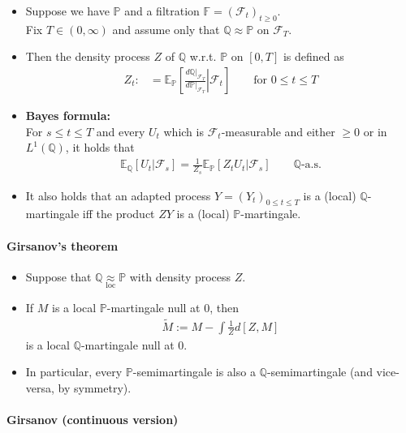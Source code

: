 \documentclass[a4paper,landscape,8pt,fleqn]{scrartcl}
\renewcommand{\emph}[1]{\textbf{#1}}
\begin{document}
\begin{multicols*}{3}
\begin{itemize}
\item Suppose we have $\mathbb{P}$ and a filtration $\mathbb{F} = (\mathcal{F}_t)_{t \geq 0}$. \\
Fix $T \in (0,\infty)$ and assume only that $\mathbb{Q} \approx \mathbb{P}$ on $\mathcal{F}_T$.
\item Then the density process $Z$ of $\mathbb{Q}$ w.r.t. $\mathbb{P}$ on $[0,T]$ is defined as
\begin{align*}
Z_t :&= \mathbb{E}_\mathbb{P} \left[ \left. \frac{d\mathbb{Q}|_{\mathcal{F}_T}}{d\mathbb{P}|_{\mathcal{F}_T}} \right\vert \mathcal{F}_t \right] \qquad \text{for } 0 \leq t \leq T
\end{align*}
\item \emph{Bayes formula:} \\
For $s \leq t \leq T$ and every $U_t$ which is $\mathcal{F}_t$-measurable and either $\geq 0$ or in $L^1(\mathbb{Q})$, it holds that
\begin{align*}
\mathbb{E}_\mathbb{Q} [U_t | \mathcal{F}_s] = \frac{1}{Z_s} \mathbb{E}_\mathbb{P}[Z_t U_t | \mathcal{F}_s] \qquad \mathbb{Q} \text{-a.s.}
\end{align*}
\item It also holds that an adapted process $Y = (Y_t)_{0 \leq t \leq T}$ is a (local) $\mathbb{Q}$-martingale iff the product $Z Y$ is a (local) $\mathbb{P}$-martingale.
\end{itemize}

\paragraph{Girsanov's theorem}

\begin{itemize}
\item Suppose that $\mathbb{Q} \underset{\text{loc}}{\approx} \mathbb{P}$ with density process $Z$.
\item If $M$ is a local $\mathbb{P}$-martingale null at 0, then
\begin{align*}
\tilde M := M - \int \frac{1}{Z} d[Z,M]
\end{align*}
is a local $\mathbb{Q}$-martingale null at 0.
\item In particular, every $\mathbb{P}$-semimartingale is also a $\mathbb{Q}$-semimartingale (and vice-versa, by symmetry).
\end{itemize}

\paragraph{Girsanov (continuous version)}


\end{multicols*}
\end{document}

